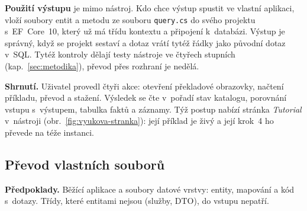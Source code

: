 \textbf{Použití výstupu} je mimo nástroj. Kdo chce výstup spustit ve vlastní aplikaci, vloží soubory entit a metodu ze souboru \texttt{query.cs} do svého projektu s~EF~Core~10, který už má třídu kontextu a připojení k~databázi. Výstup je správný, když se projekt sestaví a dotaz vrátí tytéž řádky jako původní dotaz v~SQL. Tytéž kontroly dělají testy nástroje ve čtyřech stupních (kap.~\ref{sec:metodika}), převod přes rozhraní je nedělá.

\textbf{Shrnutí.} Uživatel provedl čtyři akce: otevření překladové obrazovky, načtení příkladu, převod a stažení. Výsledek se čte v~pořadí stav katalogu, porovnání vstupu s~výstupem, tabulka faktů a záznamy. Týž postup nabízí stránka \emph{Tutorial} v~nástroji (obr.~\ref{fig:vyukova-stranka}): její příklad je živý a její krok~4 ho převede na téže instanci.


\FloatBarrier
\subsection{Převod vlastních souborů}\label{sec:vlastni}

\textbf{Předpoklady.} Běžící aplikace a soubory datové vrstvy: entity, mapování a kód s~dotazy. Třídy, které entitami nejsou (služby, DTO), do vstupu nepatří.

